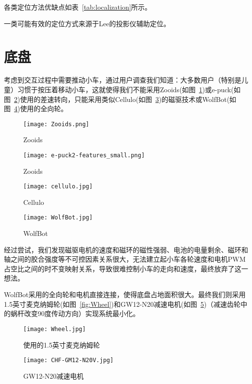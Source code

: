 
各类定位方法优缺点\cite{ozgur2018cellulo}如表~\ref{tab:localization}所示。

一类可能有效的定位方式来源于Lee\cite{lee2005moveable}的投影仪辅助定位。


\section{底盘}
考虑到交互过程中需要推动小车，通过用户调查我们知道：大多数用户（特别是儿童）习惯于按压着移动小车，这就使得我们不能采用Zooids\cite{le2016zooids}(如图~\ref{fig:Zooids})或e-puck\cite{mondada2009puck}(如图~\ref{fig:e-puck})使用的差速转向，只能采用类似Cellulo\cite{ozgur2017cellulo}(如图~\ref{fig:Cellulo})的磁驱技术或WolfBot\cite{betthauser2014wolfbot}(如图~\ref{fig:WolfBot})使用的全向轮。

\begin{figure}[htbp]
    \centering
    \texttt{[image: Zooids.png]}
    \caption{Zooids}
    \label{fig:Zooids}
\end{figure}

\begin{figure}[htbp]
    \centering
    \texttt{[image: e-puck2-features\_small.png]}
    \caption{Zooids}
    \label{fig:e-puck}
\end{figure}

\begin{figure}[htbp]
    \centering
    \texttt{[image: cellulo.jpg]}
    \caption{Cellulo}
    \label{fig:Cellulo}
\end{figure}
  
\begin{figure}[htbp]
    \centering
    \texttt{[image: WolfBot.jpg]}
    \caption{WolfBot}
    \label{fig:WolfBot}
\end{figure}

经过尝试，我们发现磁驱电机的速度和磁环的磁性强弱、电池的电量剩余、磁环和轴之间的胶合强度等不可控因素关系很大，无法建立起小车各轮速度和电机PWM占空比之间的时不变映射关系，导致很难控制小车的走向和速度，最终放弃了这一想法。

WolfBot采用的全向轮和电机直接连接，使得底盘占地面积很大。最终我们则采用1.5英寸麦克纳姆轮(如图~\ref{fig:Wheel})和GW12-N20减速电机(如图~\ref{fig:GM12})（减速齿轮中的蜗杆改变90度传动方向）实现系统最小化。

\begin{figure}
    \begin{minipage}{0.48\textwidth}
      \centering
      \texttt{[image: Wheel.jpg]}
      \caption{使用的1.5英寸麦克纳姆轮}
      \label{fig:Wheel}
    \end{minipage}\hfill
    \begin{minipage}{0.48\textwidth}
      \centering
      \texttt{[image: CHF-GM12-N20V.jpg]}
      \caption{GW12-N20减速电机}
      \label{fig:GM12}
    \end{minipage}
\end{figure}

